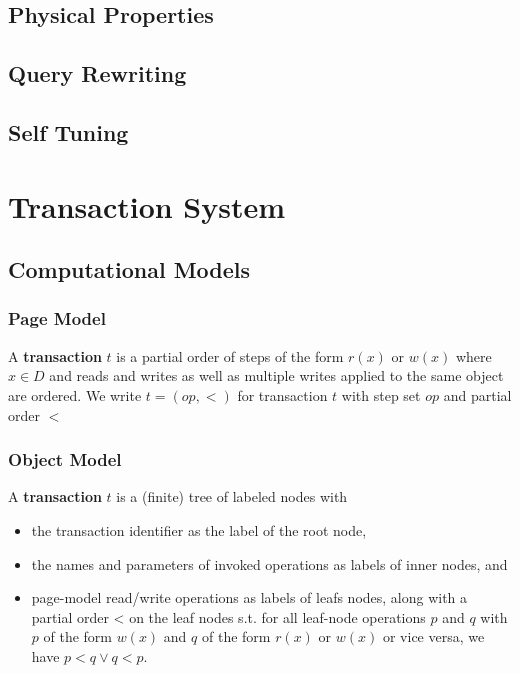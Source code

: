\documentclass[11pt]{article}
\begin{document}
\subsection{Physical Properties}
\label{sec:org5d9e038}

\subsection{Query Rewriting}
\label{sec:org28fdb37}

\subsection{Self Tuning}
\label{sec:orge09be1c}
\section{Transaction System}
\label{sec:org364a91b}
\subsection{Computational Models}
\label{sec:orgcb55b5c}
\subsubsection{Page Model}
\label{sec:org24041fa}
\begin{definition}
A \textbf{transaction} \(t\) is a partial order of steps of the form \(r(x)\) or \(w(x)\)
where \(x\in D\) and reads and writes as well as multiple writes applied to the same object are
ordered. We write \(t=(op,<)\) for transaction \(t\) with step set \(op\) and partial order \(<\)
\end{definition}
\subsubsection{Object Model}
\label{sec:orga183ad1}
\begin{definition}
A \textbf{transaction} \(t\) is a (finite) tree of labeled nodes with
\begin{itemize}
\item the transaction identifier as the label of the root node,
\item the names and parameters of invoked operations as labels of inner nodes, and
\item page-model read/write operations as labels of leafs nodes, along with a partial order < on the
leaf nodes s.t. for all leaf-node operations \(p\) and \(q\) with \(p\) of the form \(w(x)\)
and \(q\) of the form \(r(x)\) or \(w(x)\) or vice versa, we have \(p<q\vee q<p\).
\end{itemize}
\end{definition}
\end{document}
